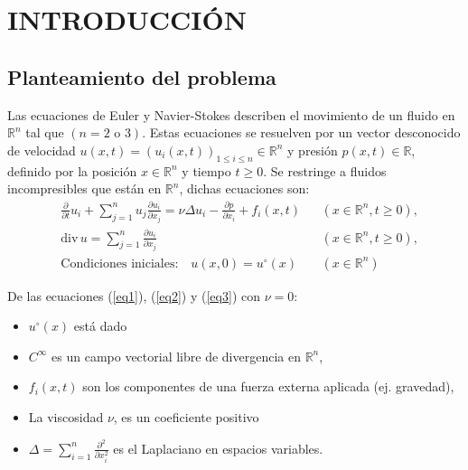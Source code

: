 
\chapter{INTRODUCCIÓN}
\setcounter{page}{1}
\section{Planteamiento del problema}
Las ecuaciones de Euler y Navier-Stokes describen el movimiento de un fluido en $\mathbb{R}^n$ tal que $(n=2\text{ o }3)$. Estas ecuaciones se resuelven por un vector desconocido de velocidad $u(x,t)= \left(u_i(x,t)\right)_{1\leq i \leq n}\in \mathbb{R}^n$ y presión $p(x,t)\in \mathbb{R}$, definido por la posición $x\in \mathbb{R}^n$ y tiempo $t\geq 0$. Se restringe a fluidos incompresibles que están en $\mathbb{R}^n$, dichas ecuaciones son:
\begin{align}
    &\frac{\partial}{\partial t} u_i + \sum_{j = 1}^n u_j \frac{\partial u_i}{\partial x_j} = \nu \Delta u_i - \frac{\partial p}{\partial x_i} + f_i(x,t)&& \left(x\in \mathbb{R}^n, t\geq 0\right),\label{eq1}\\
    &\text{div}\, u = \sum_{j = 1}^n \frac{\partial u_i}{\partial x_j} && \left(x\in \mathbb{R}^n, t\geq 0\right),\label{eq2}\\
    &\text{Condiciones iniciales:}\quad u(x,0) = u^{\circ}(x) && \left(x\in \mathbb{R}^n\right)\label{eq3}
\end{align}
\begin{notation}
De las ecuaciones (\ref{eq1}), (\ref{eq2}) y (\ref{eq3}) con $\nu=0$:
    \begin{itemize}
        \item $u^{\circ}(x)$ está dado
        \item $C^{\infty}$  es un campo vectorial libre de divergencia en $\mathbb{R}^n$,
        \item $f_i(x,t)$ son los componentes de una fuerza externa aplicada (ej. gravedad),
        \item La viscosidad $\nu$, es un coeficiente positivo
        \item $\Delta = \sum_{i=1}^n \frac{\partial^2}{\partial x_i^2}$ es el Laplaciano en espacios variables.
    \end{itemize}    
\end{notation}
